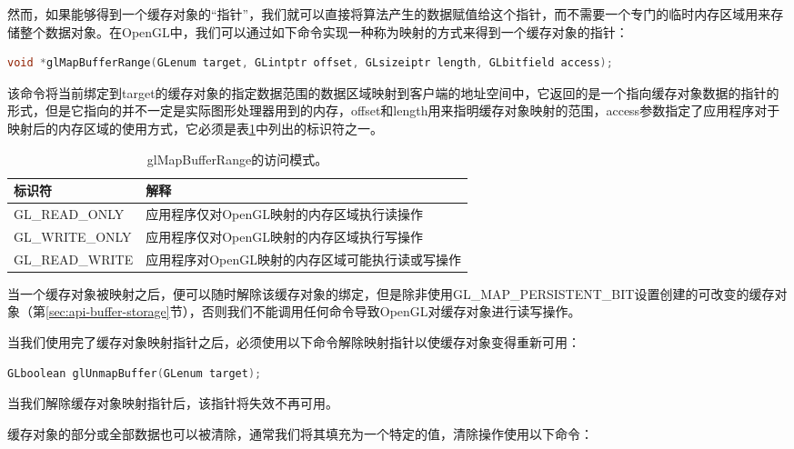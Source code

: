 然而，如果能够得到一个缓存对象的“指针”，我们就可以直接将算法产生的数据赋值给这个指针，而不需要一个专门的临时内存区域用来存储整个数据对象。在OpenGL中，我们可以通过如下命令实现一种称为映射的方式来得到一个缓存对象的指针：

\begin{lstlisting}[language=C++]
void *glMapBufferRange​(GLenum target​, GLintptr offset​, GLsizeiptr length​, GLbitfield access​);
\end{lstlisting}

该命令将当前绑定到target的缓存对象的指定数据范围的数据区域映射到客户端的地址空间中，它返回的是一个指向缓存对象数据的指针的形式，但是它指向的并不一定是实际图形处理器用到的内存，offset和length用来指明缓存对象映射的范围，access参数指定了应用程序对于映射后的内存区域的使用方式，它必须是表\ref{t:api-glMapBufferRange-access}中列出的标识符之一。

\begin{table}
\caption{glMapBufferRange的访问模式。}
\label{t:api-glMapBufferRange-access}
\centering
\begin{tabular}{>{\small}p{}|>{\small}p{}}
\hline 
   标识符 & 解释   \\
    \hline  
  GL\_READ\_ONLY    &应用程序仅对OpenGL映射的内存区域执行读操作 \\
  GL\_WRITE\_ONLY   &应用程序仅对OpenGL映射的内存区域执行写操作 \\
  GL\_READ\_WRITE   &应用程序对OpenGL映射的内存区域可能执行读或写操作 \\

 \hline 
\end{tabular}
\end{table}

当一个缓存对象被映射之后，便可以随时解除该缓存对象的绑定，但是除非使用GL\_MAP\_PERSISTENT\_BIT设置创建的可改变的缓存对象（第\ref{sec:api-buffer-storage}节），否则我们不能调用任何命令导致OpenGL对缓存对象进行读写操作。

当我们使用完了缓存对象映射指针之后，必须使用以下命令解除映射指针以使缓存对象变得重新可用：

\begin{lstlisting}[language=C++]
GLboolean glUnmapBuffer(GLenum target​);
\end{lstlisting}

当我们解除缓存对象映射指针后，该指针将失效不再可用。

缓存对象的部分或全部数据也可以被清除，通常我们将其填充为一个特定的值，清除操作使用以下命令：


